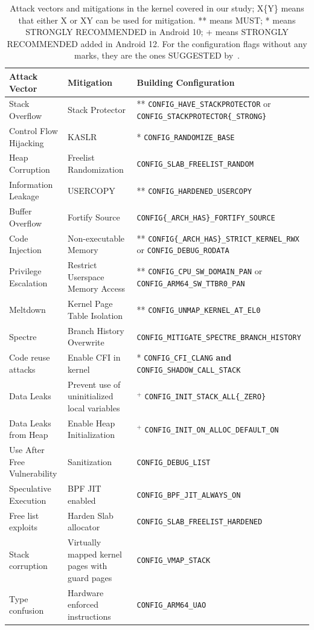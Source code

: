 \documentclass[sigconf]{acmart}
\newcommand{\cc}[1]{\mbox{\smaller[0.5]\texttt{#1}}}
\newcounter{note}[section]
\begin{document}
\begin{table}[ht]
\centering
\footnotesize
\begin{tabular}{lll}
\toprule
\textbf{Attack Vector} & \textbf{Mitigation} & \textbf{Building Configuration} \\ \midrule
Stack Overflow & Stack Protector & ** \cc{CONFIG\_HAVE\_STACKPROTECTOR} or \cc{CONFIG\_STACKPROTECTOR\{\_STRONG\}}\\
Control Flow Hijacking & KASLR & * \cc{CONFIG\_RANDOMIZE\_BASE} \\
Heap Corruption & Freelist Randomization & \cc{CONFIG\_SLAB\_FREELIST\_RANDOM} \\
Information Leakage & USERCOPY & ** \cc{CONFIG\_HARDENED\_USERCOPY} \\
Buffer Overflow & Fortify Source & \cc{CONFIG\{\_ARCH\_HAS\}\_FORTIFY\_SOURCE} \\
Code Injection & Non-executable Memory & ** \cc{CONFIG\{\_ARCH\_HAS\}\_STRICT\_KERNEL\_RWX} or \cc{CONFIG\_DEBUG\_RODATA} \\ 
Privilege Escalation & Restrict Userspace Memory Access
& ** \cc{CONFIG\_CPU\_SW\_DOMAIN\_PAN} or \cc{CONFIG\_ARM64\_SW\_TTBR0\_PAN} \\
Meltdown & Kernel Page Table Isolation & ** \cc{CONFIG\_UNMAP\_KERNEL\_AT\_EL0} \\
Spectre & Branch History Overwrite & \cc{CONFIG\_MITIGATE\_SPECTRE\_BRANCH\_HISTORY} \\
Code reuse attacks & Enable CFI in kernel & * \cc{CONFIG\_CFI\_CLANG} {\bf and} \cc{CONFIG\_SHADOW\_CALL\_STACK} \\
Data Leaks & Prevent use of uninitialized local variables & $^+$ \cc{CONFIG\_INIT\_STACK\_ALL\{\_ZERO\}} \\
Data Leaks from Heap & Enable Heap Initialization & $^+$ \cc{CONFIG\_INIT\_ON\_ALLOC\_DEFAULT\_ON} \\
Use After Free Vulnerability & Sanitization & \cc{CONFIG\_DEBUG\_LIST} \\
Speculative Execution & BPF JIT enabled & \cc{CONFIG\_BPF\_JIT\_ALWAYS\_ON} \\
Free list exploits & Harden Slab allocator & \cc{CONFIG\_SLAB\_FREELIST\_HARDENED} \\
Stack corruption & Virtually mapped kernel pages with guard pages & \cc{CONFIG\_VMAP\_STACK} \\
Type confusion & Hardware enforced instructions & \cc{CONFIG\_ARM64\_UAO} \\
\bottomrule
\end{tabular}\caption{Attack vectors and mitigations in the kernel covered in our study; X\{Y\} means that either X or XY can be used for mitigation. ** means MUST; * means STRONGLY RECOMMENDED in Android 10; + means STRONGLY RECOMMENDED added in Android 12. For the configuration flags without any marks, they are the ones SUGGESTED by~\cite{maar2024defects}.}
\label{t:attack_vectors}
\vspace{-12pt}
\end{table}
\end{document}
